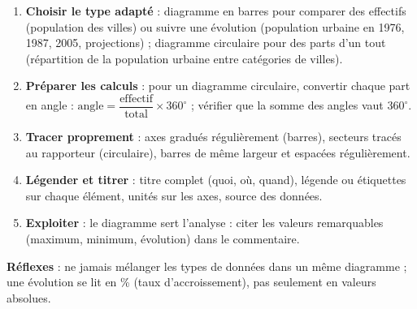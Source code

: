 \documentclass[11pt]{article}
\begin{document}
\begin{methode}
\begin{enumerate}
\item \textbf{Choisir le type adapté} : diagramme en barres pour comparer des effectifs (population des villes) ou suivre une évolution (population urbaine en 1976, 1987, 2005, projections) ; diagramme circulaire pour des parts d'un tout (répartition de la population urbaine entre catégories de villes).
\item \textbf{Préparer les calculs} : pour un diagramme circulaire, convertir chaque part en angle : $\text{angle} = \dfrac{\text{effectif}}{\text{total}} \times 360^{\circ}$ ; vérifier que la somme des angles vaut $360^{\circ}$.
\item \textbf{Tracer proprement} : axes gradués régulièrement (barres), secteurs tracés au rapporteur (circulaire), barres de même largeur et espacées régulièrement.
\item \textbf{Légender et titrer} : titre complet (quoi, où, quand), légende ou étiquettes sur chaque élément, unités sur les axes, source des données.
\item \textbf{Exploiter} : le diagramme sert l'analyse : citer les valeurs remarquables (maximum, minimum, évolution) dans le commentaire.
\end{enumerate}
\textbf{Réflexes} : ne jamais mélanger les types de données dans un même diagramme ; une évolution se lit en \% (taux d'accroissement), pas seulement en valeurs absolues.
\end{methode}
\end{document}
